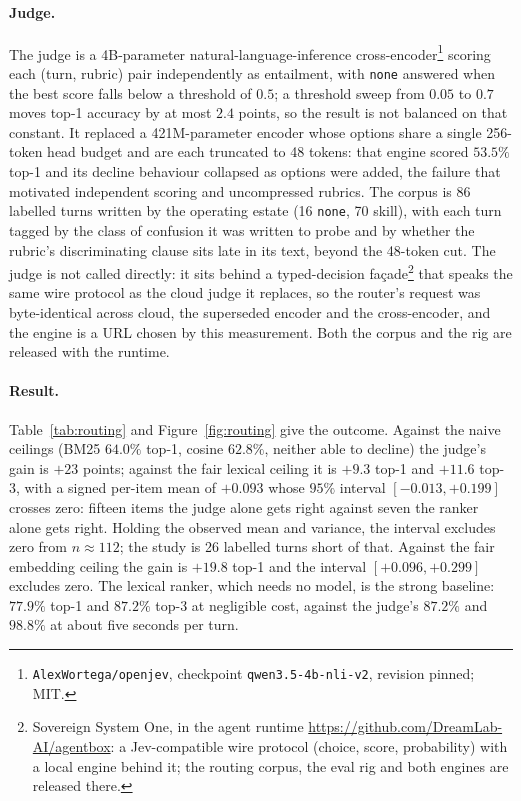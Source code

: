 \paragraph{Judge.} The judge is a 4B-parameter natural-language-inference cross-encoder\footnote{\texttt{AlexWortega/openjev}, checkpoint \texttt{qwen3.5-4b-nli-v2}, revision pinned; MIT.} scoring each (turn, rubric) pair independently as entailment, with \texttt{none} answered when the best score falls below a threshold of $0.5$; a threshold sweep from $0.05$ to $0.7$ moves top-1 accuracy by at most $2.4$ points, so the result is not balanced on that constant. It replaced a 421M-parameter encoder whose options share a single 256-token head budget and are each truncated to 48 tokens: that engine scored $53.5\%$ top-1 and its decline behaviour collapsed as options were added, the failure that motivated independent scoring and uncompressed rubrics. The corpus is 86 labelled turns written by the operating estate (16 \texttt{none}, 70 skill), with each turn tagged by the class of confusion it was written to probe and by whether the rubric's discriminating clause sits late in its text, beyond the 48-token cut. The judge is not called directly: it sits behind a typed-decision façade\footnote{Sovereign System One, in the agent runtime \url{https://github.com/DreamLab-AI/agentbox}: a Jev-compatible wire protocol (choice, score, probability) with a local engine behind it; the routing corpus, the eval rig and both engines are released there.} that speaks the same wire protocol as the cloud judge it replaces, so the router's request was byte-identical across cloud, the superseded encoder and the cross-encoder, and the engine is a URL chosen by this measurement. Both the corpus and the rig are released with the runtime.

\paragraph{Result.} Table~\ref{tab:routing} and Figure~\ref{fig:routing} give the outcome. Against the naive ceilings (BM25 $64.0\%$ top-1, cosine $62.8\%$, neither able to decline) the judge's gain is $+23$ points; against the fair lexical ceiling it is $+9.3$ top-1 and $+11.6$ top-3, with a signed per-item mean of $+0.093$ whose $95\%$ interval $[-0.013,+0.199]$ crosses zero: fifteen items the judge alone gets right against seven the ranker alone gets right. Holding the observed mean and variance, the interval excludes zero from $n\approx112$; the study is 26 labelled turns short of that. Against the fair embedding ceiling the gain is $+19.8$ top-1 and the interval $[+0.096,+0.299]$ excludes zero. The lexical ranker, which needs no model, is the strong baseline: $77.9\%$ top-1 and $87.2\%$ top-3 at negligible cost, against the judge's $87.2\%$ and $98.8\%$ at about five seconds per turn.

